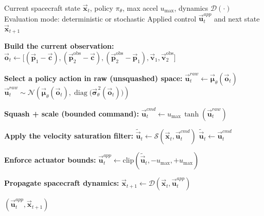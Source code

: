 \begin{algorithm}[H]
\caption{Policy Interface + Spacecraft Actuation: Policy Action $\rightarrow$ Applied Acceleration}
\label{alg:actuation_interface}
\begin{algorithmic}[1]
\Require Current spacecraft state $\vec{\mathbf{x}}_t$, policy $\pi_\theta$, max accel $u_{\max}$, dynamics $\mathcal{D}(\cdot)$
\Require Evaluation mode: deterministic or stochastic
\Ensure Applied control $\vec{\mathbf{u}}_t^{app}$ and next state $\vec{\mathbf{x}}_{t+1}$

\State \textbf{Build the current observation:}
\State \hspace{1em} $\vec{\mathbf{o}}_t \leftarrow \big[(\vec{\mathbf{p}}_1-\vec{\mathbf{c}}),(\vec{\mathbf{p}}_2^{\mathrm{obs}}-\vec{\mathbf{c}}),(\vec{\mathbf{p}}_2^{\mathrm{obs}}-\vec{\mathbf{p}}_1),\vec{\mathbf{v}}_1,\vec{\mathbf{v}}_2^{\mathrm{obs}}\big]$

\State \textbf{Select a policy action in raw (unsquashed) space:}
    \State \hspace{1em} $\vec{\mathbf{u}}_t^{raw} \leftarrow \vec{\boldsymbol{\mu}}_\theta(\vec{\mathbf{o}}_t)$
\Else
    \State \hspace{1em} $\vec{\mathbf{u}}_t^{raw} \sim \mathcal{N}\!\left(\vec{\boldsymbol{\mu}}_\theta(\vec{\mathbf{o}}_t), \operatorname{diag}\!\big(\vec{\boldsymbol{\sigma}}_\theta^{\,2}(\vec{\mathbf{o}}_t)\big)\right)$
\EndIf

\State \textbf{Squash + scale (bounded command):}
\State \hspace{1em} $\vec{\mathbf{u}}_t^{cmd} \leftarrow u_{\max}\,\tanh\!\left(\vec{\mathbf{u}}_t^{raw}\right)$

\State \textbf{Apply the velocity saturation filter:}
    \State \hspace{1em} $\tilde{\vec{\mathbf{u}}}_t \leftarrow \mathcal{S}\!\left(\vec{\mathbf{x}}_t,\vec{\mathbf{u}}_t^{cmd}\right)$
\Else
    \State \hspace{1em} $\tilde{\vec{\mathbf{u}}}_t \leftarrow \vec{\mathbf{u}}_t^{cmd}$
\EndIf

\State \textbf{Enforce actuator bounds:}
\State \hspace{1em} $\vec{\mathbf{u}}_t^{app} \leftarrow \mathrm{clip}\!\left(\tilde{\vec{\mathbf{u}}}_t,-u_{\max},+u_{\max}\right)$

\State \textbf{Propagate spacecraft dynamics:}
\State \hspace{1em} $\vec{\mathbf{x}}_{t+1} \leftarrow \mathcal{D}\!\left(\vec{\mathbf{x}}_t,\vec{\mathbf{u}}_t^{app}\right)$

\State \Return $(\vec{\mathbf{u}}_t^{app}, \vec{\mathbf{x}}_{t+1})$
\end{algorithmic}
\end{algorithm}




